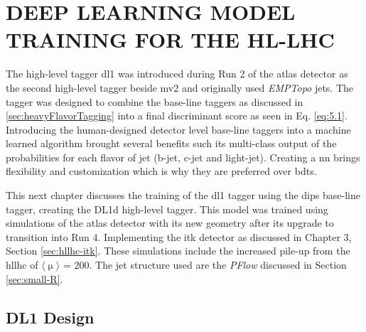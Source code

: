 \begingroup
\clearpage%
\let\clearpage\relax%
\vspace*{-16pt}%
\chapter[DEEP LEARNING MODEL TRAINING FOR THE HL-LHC]{DEEP LEARNING MODEL TRAINING FOR THE HL-LHC}
\label{ch5}
\endgroup

The high-level tagger \gls{dl1} was introduced during Run 2 of the \gls{atlas} detector as the second high-level tagger beside \gls{mv2} and originally used \textit{EMPTopo} jets. 
The tagger was designed to combine the base-line taggers as discussed in \ref{sec:heavyFlavorTagging} into a final discriminant score as seen in Eq. \ref{eq:5.1}. Introducing 
the human-designed detector level base-line taggers into a machine learned algorithm brought several benefits such its multi-class output of the probabilities for each 
flavor of jet (b-jet, c-jet and light-jet). Creating a \gls{nn} brings flexibility and customization which is why they are preferred over \gls{bdt}s.
\par
This next chapter discusses the training of the \gls{dl1} tagger using the \gls{dips} base-line tagger, creating the DL1d high-level tagger. This model was trained using simulations 
of the \gls{atlas} detector with its new geometry after its upgrade to transition into Run 4. Implementing the \gls{itk} detector as discussed in Chapter 3, Section \ref{sec:hllhc-itk}.
These simulations include the increased pile-up from the \gls{hllhc} of $\langle \upmu \rangle$ = $\textrm{200}$. The jet structure used are the \textit{PFlow} discussed in 
Section \ref{sec:small-R}. 

\section{DL1 Design}

